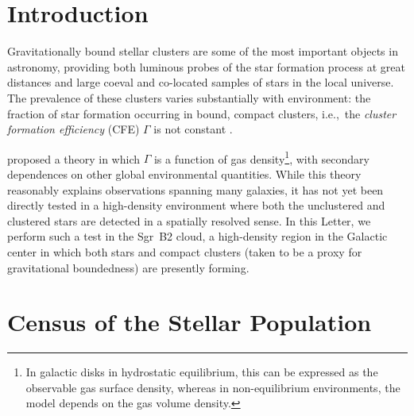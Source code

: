 \documentclass[twocolumn]{aastex62}
\begin{document}
\section{Introduction}
Gravitationally bound stellar clusters are some of the most important objects
in astronomy, providing both luminous probes of the star formation process at
great distances \citep[e.g.,][among many
others]{Brodie2006a,Adamo2013a,Kruijssen2018b,Kruijssen2018a} and large coeval
and co-located samples of stars in the local universe.  The prevalence of these
clusters varies substantially with environment: the fraction of star formation
occurring in bound, compact clusters, i.e.,~the \emph{cluster formation
efficiency} (CFE) $\Gamma$ is not constant
\citep{Adamo2015a,Johnson2016a,Messa2018a}.

\citet{Kruijssen2012a} proposed a theory in which $\Gamma$ is a function of gas
density\footnote{In galactic disks in hydrostatic equilibrium, this can be
expressed as the observable gas surface density, whereas in non-equilibrium
environments, the model depends on the gas volume density.}, with secondary
dependences on other global environmental quantities.  While this theory
reasonably explains observations spanning many galaxies, it has not yet been
directly tested in a
high-density environment where both the unclustered and clustered stars are
detected in a spatially resolved sense.  In this Letter, we perform such a test
in the Sgr~B2 cloud, a high-density region in the Galactic center in which both
stars and compact clusters (taken to be a proxy for gravitational boundedness)
are presently forming.


\section{Census of the Stellar Population}
\end{document}
